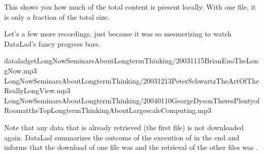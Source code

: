 \sphinxAtStartPar
This shows you how much of the total content is present locally. With one file,
it is only a fraction of the total size.

\sphinxAtStartPar
Let’s  a few more recordings, just because it was so mesmerizing to watch
DataLad’s fancy progress bars.

\begin{sphinxVerbatim}[commandchars=\\\{\}]
dataladgetLong\PYGZus{}Now\PYGZus{}\PYGZus{}Seminars\PYGZus{}About\PYGZus{}Long\PYGZus{}term\PYGZus{}Thinking/2003\PYGZus{}11\PYGZus{}15\PYGZus{}\PYGZus{}Brian\PYGZus{}Eno\PYGZus{}\PYGZus{}The\PYGZus{}Long\PYGZus{}Now.mp3
Long\PYGZus{}Now\PYGZus{}\PYGZus{}Seminars\PYGZus{}About\PYGZus{}Long\PYGZus{}term\PYGZus{}Thinking/2003\PYGZus{}12\PYGZus{}13\PYGZus{}\PYGZus{}Peter\PYGZus{}Schwartz\PYGZus{}\PYGZus{}The\PYGZus{}Art\PYGZus{}Of\PYGZus{}The\PYGZus{}Really\PYGZus{}Long\PYGZus{}View.mp3
Long\PYGZus{}Now\PYGZus{}\PYGZus{}Seminars\PYGZus{}About\PYGZus{}Long\PYGZus{}term\PYGZus{}Thinking/2004\PYGZus{}01\PYGZus{}10\PYGZus{}\PYGZus{}George\PYGZus{}Dyson\PYGZus{}\PYGZus{}There\PYGZus{}s\PYGZus{}Plenty\PYGZus{}of\PYGZus{}Room\PYGZus{}at\PYGZus{}the\PYGZus{}Top\PYGZus{}\PYGZus{}Long\PYGZus{}term\PYGZus{}Thinking\PYGZus{}About\PYGZus{}Large\PYGZus{}scale\PYGZus{}Computing.mp3
\end{sphinxVerbatim}

\sphinxAtStartPar
Note that any data that is already retrieved (the first file) is not downloaded again.
DataLad summarizes the outcome of the execution of  in the end and informs
that the download of one file was  and the retrieval of the other files was .

